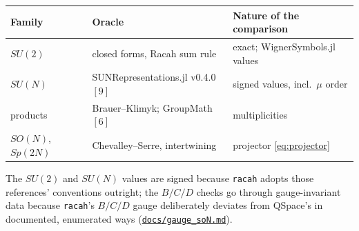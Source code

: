 \documentclass[11pt,a4paper]{article}
\theoremstyle{plain}
\theoremstyle{definition}
\newcommand{\code}[1]{\texttt{#1}}
\newcommand{\gaugeson}{\href{https://github.com/Ryo-wtnb11/fusion-symbols/blob/main/docs/gauge_soN.md}{\code{docs/gauge\_soN.md}}}
\begin{document}
\begin{center}
\small
\begin{tabular}{@{}lll@{}}
\toprule
Family & Oracle & Nature of the comparison \\
\midrule
$SU(2)$ & closed forms, Racah sum rule & exact; WignerSymbols.jl values \\
$SU(N)$ & SUNRepresentations.jl v0.4.0 $[9]$ & signed values, incl.\ $\mu$ order \\
products & Brauer--Klimyk; GroupMath $[6]$ & multiplicities \\
$SO(N)$, $Sp(2N)$ & Chevalley--Serre, intertwining & projector \eqref{eq:projector} \\
\bottomrule
\end{tabular}
\end{center}

The $SU(2)$ and $SU(N)$ values are signed because \code{racah} adopts those
references' conventions outright; the $B/C/D$ checks go through gauge-invariant
data because \code{racah}'s $B/C/D$ gauge deliberately deviates from QSpace's
in documented, enumerated ways (\gaugeson{}).
\end{document}
